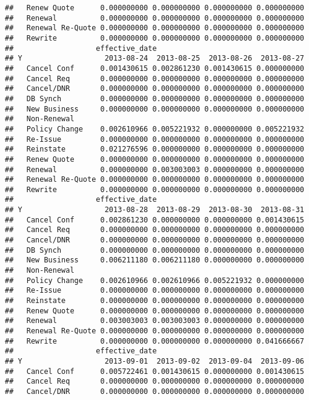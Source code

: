 \documentclass[]{article}
\begin{document}
\begin{verbatim}
##   Renew Quote      0.000000000 0.000000000 0.000000000 0.000000000
##   Renewal          0.000000000 0.000000000 0.000000000 0.000000000
##   Renewal Re-Quote 0.000000000 0.000000000 0.000000000 0.000000000
##   Rewrite          0.000000000 0.000000000 0.000000000 0.000000000
##                   effective_date
## Y                   2013-08-24  2013-08-25  2013-08-26  2013-08-27
##   Cancel Conf      0.001430615 0.002861230 0.001430615 0.000000000
##   Cancel Req       0.000000000 0.000000000 0.000000000 0.000000000
##   Cancel/DNR       0.000000000 0.000000000 0.000000000 0.000000000
##   DB Synch         0.000000000 0.000000000 0.000000000 0.000000000
##   New Business     0.000000000 0.000000000 0.000000000 0.000000000
##   Non-Renewal                                                     
##   Policy Change    0.002610966 0.005221932 0.000000000 0.005221932
##   Re-Issue         0.000000000 0.000000000 0.000000000 0.000000000
##   Reinstate        0.021276596 0.000000000 0.000000000 0.000000000
##   Renew Quote      0.000000000 0.000000000 0.000000000 0.000000000
##   Renewal          0.000000000 0.003003003 0.000000000 0.000000000
##   Renewal Re-Quote 0.000000000 0.000000000 0.000000000 0.000000000
##   Rewrite          0.000000000 0.000000000 0.000000000 0.000000000
##                   effective_date
## Y                   2013-08-28  2013-08-29  2013-08-30  2013-08-31
##   Cancel Conf      0.002861230 0.000000000 0.000000000 0.001430615
##   Cancel Req       0.000000000 0.000000000 0.000000000 0.000000000
##   Cancel/DNR       0.000000000 0.000000000 0.000000000 0.000000000
##   DB Synch         0.000000000 0.000000000 0.000000000 0.000000000
##   New Business     0.006211180 0.006211180 0.000000000 0.000000000
##   Non-Renewal                                                     
##   Policy Change    0.002610966 0.002610966 0.005221932 0.000000000
##   Re-Issue         0.000000000 0.000000000 0.000000000 0.000000000
##   Reinstate        0.000000000 0.000000000 0.000000000 0.000000000
##   Renew Quote      0.000000000 0.000000000 0.000000000 0.000000000
##   Renewal          0.003003003 0.003003003 0.000000000 0.000000000
##   Renewal Re-Quote 0.000000000 0.000000000 0.000000000 0.000000000
##   Rewrite          0.000000000 0.000000000 0.000000000 0.041666667
##                   effective_date
## Y                   2013-09-01  2013-09-02  2013-09-04  2013-09-06
##   Cancel Conf      0.005722461 0.001430615 0.000000000 0.001430615
##   Cancel Req       0.000000000 0.000000000 0.000000000 0.000000000
##   Cancel/DNR       0.000000000 0.000000000 0.000000000 0.000000000

\end{verbatim}
\end{document}

